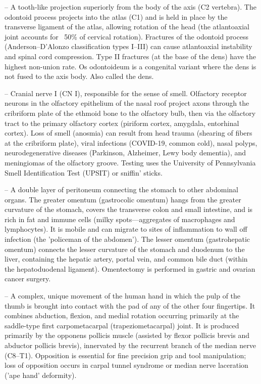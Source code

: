-- A tooth-like projection superiorly from the body of the axis (C2 vertebra). The odontoid process projects into the atlas (C1) and is held in place by the transverse ligament of the atlas, allowing rotation of the head (the atlantoaxial joint accounts for ~50\% of cervical rotation). Fractures of the odontoid process (Anderson--D'Alonzo classification types I--III) can cause atlantoaxial instability and spinal cord compression. Type II fractures (at the base of the dens) have the highest non-union rate. Os odontoideum is a congenital variant where the dens is not fused to the axis body. Also called the dens.

-- Cranial nerve I (CN I), responsible for the sense of smell. Olfactory receptor neurons in the olfactory epithelium of the nasal roof project axons through the cribriform plate of the ethmoid bone to the olfactory bulb, then via the olfactory tract to the primary olfactory cortex (piriform cortex, amygdala, entorhinal cortex). Loss of smell (anosmia) can result from head trauma (shearing of fibers at the cribriform plate), viral infections (COVID-19, common cold), nasal polyps, neurodegenerative diseases (Parkinson, Alzheimer, Lewy body dementia), and meningiomas of the olfactory groove. Testing uses the University of Pennsylvania Smell Identification Test (UPSIT) or sniffin' sticks.

-- A double layer of peritoneum connecting the stomach to other abdominal organs. The greater omentum (gastrocolic omentum) hangs from the greater curvature of the stomach, covers the transverse colon and small intestine, and is rich in fat and immune cells (milky spots—aggregates of macrophages and lymphocytes). It is mobile and can migrate to sites of inflammation to wall off infection (the 'policeman of the abdomen'). The lesser omentum (gastrohepatic omentum) connects the lesser curvature of the stomach and duodenum to the liver, containing the hepatic artery, portal vein, and common bile duct (within the hepatoduodenal ligament). Omentectomy is performed in gastric and ovarian cancer surgery.

-- A complex, unique movement of the human hand in which the pulp of the thumb is brought into contact with the pad of any of the other four fingertips. It combines abduction, flexion, and medial rotation occurring primarily at the saddle-type first carpometacarpal (trapeziometacarpal) joint. It is produced primarily by the opponens pollicis muscle (assisted by flexor pollicis brevis and abductor pollicis brevis), innervated by the recurrent branch of the median nerve (C8--T1). Opposition is essential for fine precision grip and tool manipulation; loss of opposition occurs in carpal tunnel syndrome or median nerve laceration ('ape hand' deformity).

